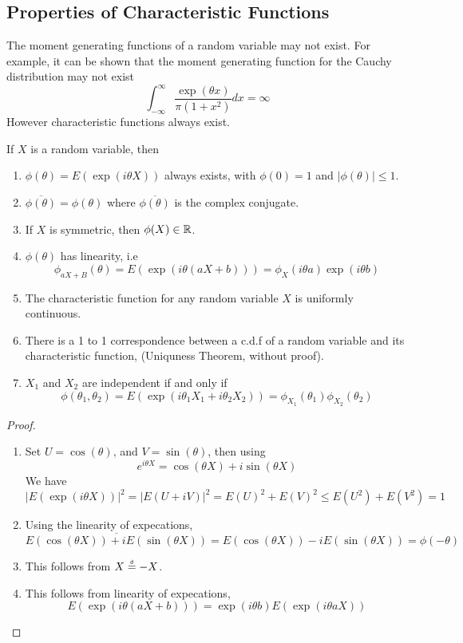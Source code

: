 \documentclass[openany]{report}
\begin{document}
\subsection{Properties of Characteristic Functions}
The moment generating functions of a random variable may not exist. For example, it can be shown that the moment generating function for the Cauchy distribution may not exist 
\[\int_{-\infty}^{\infty}\frac{\exp(\theta x)}{\pi(1+x^2)}dx = \infty\]
However characteristic functions always exist.
\begin{theorem}
    If $X$ is a random variable, then 
    \begin{enumerate}[label=(\roman*)]
        \item $\phi(\theta) = E(\exp(i\theta X))$ always exists, with $\phi(0) = 1$ and $|\phi(\theta)| \leq 1$.
        \item $\overline{\phi(\theta)} = \phi(\theta)$ where $\overline{\phi(\theta)}$ is the complex conjugate.
        \item If $X$ is symmetric, then $\phi(X) \in \mathbb{R}$.
        \item $\phi(\theta)$ has linearity, i.e
        \[\phi_{aX + B}(\theta) = E(\exp(i\theta(aX+b))) = \phi_X(i\theta a)\exp(i\theta b)\]
        \item The characteristic function for any random variable $X$ is uniformly continuous.
        \item There is a 1 to 1 correspondence between a c.d.f of a random variable and its characteristic function, (Uniquness Theorem, without proof).
        \item $X_1$ and $X_2$ are independent if and only if 
        \[\phi(\theta_1,\theta_2) = E(\exp(i\theta_1X_1 + i\theta_2X_2)) = \phi_{X_1}(\theta_1)\phi_{X_2}(\theta_2)\]
    \end{enumerate}
\end{theorem}
\begin{proof}
    \begin{enumerate}[label=(\roman*)]
        \item Set $U = \cos(\theta)$, and $V = \sin(\theta)$, then using 
        \[e^{i\theta X} = \cos(\theta X) + i\sin(\theta X)\]
        We have 
        \[|E(\exp(i\theta X))|^2 = |E(U + iV)|^2 = E(U)^2 + E(V)^2 \leq E(U^2) + E(V^2) = 1\]
        \item Using the linearity of expecations, 
        \[\overline{E(\cos(\theta X)) + iE(\sin(\theta X))} = E(\cos(\theta X)) - iE(\sin(\theta X)) = \phi(-\theta)\]
        \item This follows from $X \eqd -X$.
        \item This follows from linearity of expecations,
        \[E(\exp(i\theta(aX + b))) = \exp(i\theta b)E(\exp(i\theta a X))\]
    \end{enumerate}
\end{proof}
\end{document}
